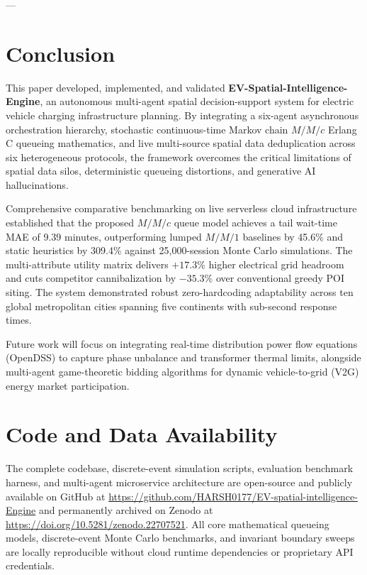\documentclass[preprint,12pt,authoryear]{elsarticle}
\begin{document}
---

\section{Conclusion}
\label{sec:conclusion}
This paper developed, implemented, and validated \textbf{EV-Spatial-Intelligence-Engine}, an autonomous multi-agent spatial decision-support system for electric vehicle charging infrastructure planning. By integrating a six-agent asynchronous orchestration hierarchy, stochastic continuous-time Markov chain $M/M/c$ Erlang C queueing mathematics, and live multi-source spatial data deduplication across six heterogeneous protocols, the framework overcomes the critical limitations of spatial data silos, deterministic queueing distortions, and generative AI hallucinations.

Comprehensive comparative benchmarking on live serverless cloud infrastructure established that the proposed $M/M/c$ queue model achieves a tail wait-time MAE of 9.39 minutes, outperforming lumped $M/M/1$ baselines by 45.6\% and static heuristics by 309.4\% against 25,000-session Monte Carlo simulations. The multi-attribute utility matrix delivers $+17.3\%$ higher electrical grid headroom and cuts competitor cannibalization by $-35.3\%$ over conventional greedy POI siting. The system demonstrated robust zero-hardcoding adaptability across ten global metropolitan cities spanning five continents with sub-second response times.

Future work will focus on integrating real-time distribution power flow equations (OpenDSS) to capture phase unbalance and transformer thermal limits, alongside multi-agent game-theoretic bidding algorithms for dynamic vehicle-to-grid (V2G) energy market participation.

\section*{Code and Data Availability}
The complete codebase, discrete-event simulation scripts, evaluation benchmark harness, and multi-agent microservice architecture are open-source and publicly available on GitHub at \url{https://github.com/HARSH0177/EV-spatial-intelligence-Engine} and permanently archived on Zenodo at \url{https://doi.org/10.5281/zenodo.22707521}. All core mathematical queueing models, discrete-event Monte Carlo benchmarks, and invariant boundary sweeps are locally reproducible without cloud runtime dependencies or proprietary API credentials.
\end{document}
